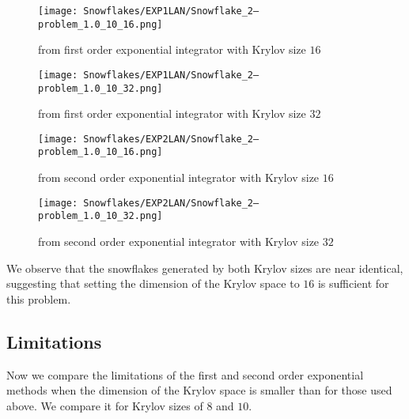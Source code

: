 \begin{figure}[H]
    \centering
    \begin{minipage}{0.49\textwidth}
        \texttt{[image: Snowflakes/EXP1LAN/Snowflake\_2--problem\_1.0\_10\_16.png]} %
        \caption{from first order exponential integrator with Krylov size $16$}
        \label{fig:first order 16}
    \end{minipage}\hfill
    \centering
    \begin{minipage}{0.49\textwidth}
        \texttt{[image: Snowflakes/EXP1LAN/Snowflake\_2--problem\_1.0\_10\_32.png]} %
        \caption{from first order exponential integrator with Krylov size $32$}
        \label{fig:first order 32}
    \end{minipage}\hfill
\end{figure}\begin{figure}[H]
    \centering
    \begin{minipage}{0.49\textwidth}
        \texttt{[image: Snowflakes/EXP2LAN/Snowflake\_2--problem\_1.0\_10\_16.png]} %
        \caption{from second order exponential integrator with Krylov size $16$}
        \label{fig:second order 16}
    \end{minipage}\hfill
    \centering
    \begin{minipage}{0.49\textwidth}
        \texttt{[image: Snowflakes/EXP2LAN/Snowflake\_2--problem\_1.0\_10\_32.png]} %
        \caption{from second order exponential integrator with Krylov size $32$}
        \label{fig:second order 32}
    \end{minipage}\hfill
\end{figure}

We observe that the snowflakes generated by both Krylov sizes are near identical, 
suggesting that setting the dimension of the Krylov space to $16$ is sufficient for this problem.\\

\subsection{Limitations}
Now we compare the limitations of the first and second order exponential methods when the dimension of the Krylov space is smaller than for those used above.
We compare it for Krylov sizes of $8$ and $10$.

